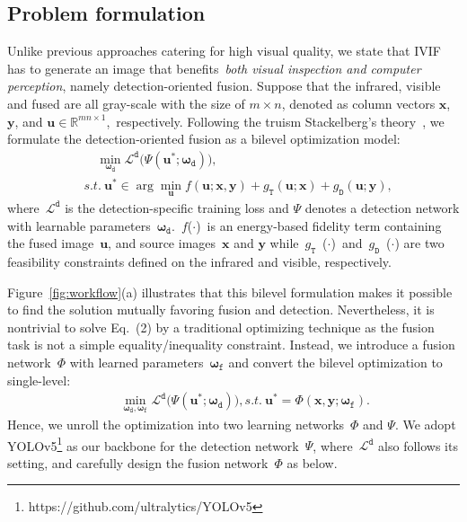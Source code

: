\documentclass[10pt,twocolumn,letterpaper]{article}
\begin{document}
\subsection{Problem formulation}
Unlike previous approaches catering for high visual quality, we state that IVIF has to generate an image that benefits~\emph{both visual inspection and computer perception}, namely detection-oriented fusion. Suppose that the infrared, visible and fused are all gray-scale with the size of $m\times n$, denoted as column vectors $\mathbf{x}$, $\mathbf{y}$, and $\mathbf{u}\in\mathbb{R}^{{mn}\times{1}}$,~respectively. 
Following the truism Stackelberg's theory~\cite{Ochs2015Bilevel,BILEVEL1,BILEVEL2}, we formulate the detection-oriented fusion as a bilevel optimization model: 
\vspace{-0.1cm} 
\begin{eqnarray}
&\quad\min\limits_{\bm{\omega}_{\mathtt{d}}} \mathcal{L}^{\mathtt{d}}\big(\Psi(\mathbf{u}^*;\bm{\omega}_{\mathtt{d}})\big),\\
&s.t. \ \mathbf{u}^*\in\arg\min\limits_{\mathbf{u}} f(\mathbf{u;x,y}) + g_{\mathtt{T}}(\mathbf{u;x}) + g_{\mathtt{D}}(\mathbf{u;y}),
\end{eqnarray}
where~$\mathcal{L}^{\mathtt{d}}$ is the detection-specific training loss and $\Psi$ denotes a detection network with learnable parameters~$\bm{\omega}_{\mathtt{d}}$.~$f$($\cdot$)~is an energy-based fidelity term containing the fused image~$\mathbf{u}$, and source images~$\mathbf{x}$ and $\mathbf{y}$ while~$g_{\mathtt{T}}$~($\cdot$)~and~$ g_{\mathtt{D}}$~($\cdot$) are two feasibility constraints defined on the infrared and visible, respectively.


Figure~\ref{fig:workflow}(a) illustrates that this bilevel formulation makes it possible to find the solution mutually favoring fusion and detection. Nevertheless, it is nontrivial to solve Eq.~(2) by a traditional optimizing technique as the fusion task is not a simple equality/inequality constraint. Instead, we introduce a fusion network~$\Phi$ with learned parameters~$\bm{\omega}_{\mathtt{f}}$ and convert the bilevel optimization to single-level:         
\begin{eqnarray}
&\quad\min\limits_{\bm{\omega}_{\mathtt{d}}, \bm{\omega}_{\mathtt{f}}} \mathcal{L}^{\mathtt{d}}\big(\Psi(\mathbf{u}^*;\bm{\omega}_{\mathtt{d}})\big),
s.t. \ \mathbf{u}^*=\Phi(\mathbf{x,y}; {\bm{\omega}_{\mathtt{f}}}).
\end{eqnarray}
Hence, we unroll the optimization into two learning networks~$\Phi$ and $\Psi$. We adopt YOLOv5\footnote{https://github.com/ultralytics/YOLOv5} as our backbone for the detection network~$\Psi$, where~$\mathcal{L}^{\mathtt{d}}$ also follows its setting, and carefully design the fusion network~$\Phi$ as below.
\vspace{-0.2cm} 
\end{document}
